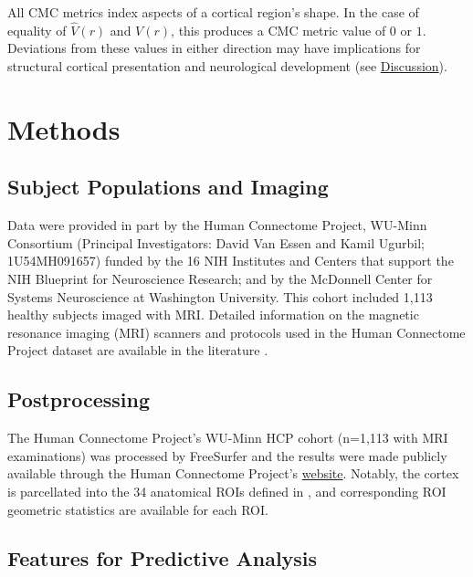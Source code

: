 \documentclass{article}
\newcommand{\CMC}{\(\text{CMC}\) }
\begin{document}
All CMC metrics index aspects of a cortical region's shape. In the case of
equality of \(\hat{V}(r)\) and \(V(r)\), this produces a \CMC metric value of
\(0\) or \(1\). Deviations from these values in either direction may have
implications for structural cortical presentation and neurological
development (see \hyperref[sec:discussion]{Discussion}).

\section{Methods}
\label{sec:methods}
\subsection{Subject Populations and Imaging}
\label{sec:population}

Data were provided in part by the Human Connectome Project, WU-Minn
Consortium (Principal Investigators: David Van Essen and Kamil Ugurbil;
1U54MH091657) funded by the 16 NIH Institutes and Centers that support the
NIH Blueprint for Neuroscience Research; and by the McDonnell Center for
Systems Neuroscience at Washington University. This cohort included 1,113
healthy subjects imaged with MRI\@. Detailed information on the magnetic
resonance imaging (MRI) scanners and protocols used in the Human Connectome
Project dataset are available in the literature
\citep{elamHumanConnectomeProject2021}.

\subsection{Postprocessing}
\label{sec:postprocessing}

The Human Connectome Project's WU-Minn HCP cohort (n=1,113 with MRI
examinations) was processed by FreeSurfer \citep{fischlFreeSurfer2012} and
the results were made publicly available through the Human Connectome
Project's \href{%
https://www.humanconnectome.org/study/hcp-young-adult/document/1200-subjects-data-release}{website}.
Notably, the cortex is parcellated into the 34 anatomical ROIs defined in
\citet{desikanAutomatedLabelingSystem2006}, and corresponding ROI geometric
statistics are available for each ROI.

\subsection{Features for Predictive Analysis}
\end{document}
